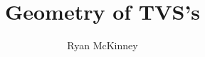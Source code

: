 \documentclass[12pt,oneside,letterpaper]{book}
\title{Geometry of TVS's}
\author{Ryan McKinney}
\begin{document}
	\newtheorem{thm}{Theorem}[section]
	\newtheorem{cor}[thm]{Corollary}
	\newtheorem{lem}[thm]{Lemma}
	\newtheorem{prop}[thm]{Proposition}
	\newtheorem{example}[thm]{Example}
	\newtheorem{rmk}[thm]{Remark}
	\newtheorem{df}[thm]{Definition}


\frontmatter
\maketitle

\tableofcontents
\listoffigures
\listoftables


\mainmatter






\backmatter

\end{document}
